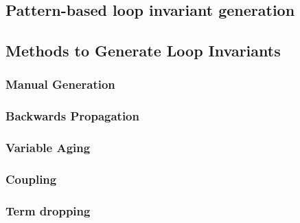 \cite{dafny-started}
\cite{dafny-lang}
\cite{dafny-mech}

\subsection{Pattern-based loop invariant generation}

\cite{pattern-loop-inv}

\subsection{Methods to Generate Loop Invariants}

\subsubsection{Manual Generation}

\cite{broda-loop-tech}

\subsubsection{Backwards Propagation}

\cite{infer-postconditions}
\cite{infer-dynamic}

\subsubsection{Variable Aging}

\cite{infer-postconditions}
\cite{infer-dynamic}

\subsubsection{Coupling}

\cite{infer-postconditions}
\cite{infer-dynamic}

\subsubsection{Term dropping}

\cite{infer-postconditions}
\cite{infer-dynamic}

\cite{struct-induction}

